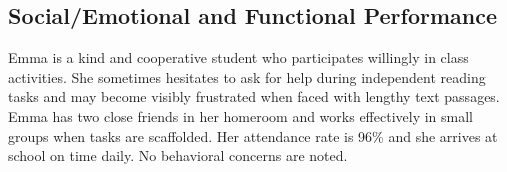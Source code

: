 \subsection{Social/Emotional and Functional Performance}

Emma is a kind and cooperative student who participates willingly in class activities. She sometimes hesitates to ask for help during independent reading tasks and may become visibly frustrated when faced with lengthy text passages. Emma has two close friends in her homeroom and works effectively in small groups when tasks are scaffolded. Her attendance rate is 96\% and she arrives at school on time daily. No behavioral concerns are noted.

\vspace{6pt}
